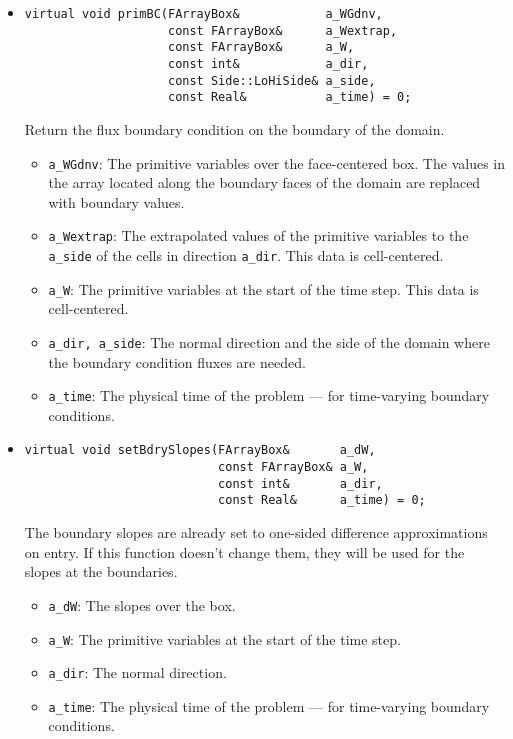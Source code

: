\begin{itemize}
\item \begin{small}\begin{verbatim}
virtual void primBC(FArrayBox&            a_WGdnv,
                    const FArrayBox&      a_Wextrap,
                    const FArrayBox&      a_W,
                    const int&            a_dir,
                    const Side::LoHiSide& a_side,
                    const Real&           a_time) = 0;
\end{verbatim}\end{small}
Return the flux boundary condition on the boundary of
the domain.
\begin{itemize}
\item \verb/a_WGdnv/:  The primitive variables over the face-centered
box. The values in the array located along the boundary faces of the
domain are replaced with boundary values.
\vspace{-0.07in}
\item \verb/a_Wextrap/:  The extrapolated values of the primitive variables
to the \verb/a_side/ of the cells in direction \verb/a_dir/.
This data is cell-centered.
\vspace{-0.07in}
\item \verb/a_W/:  The primitive variables at the start of the time step.
This data is cell-centered.
\vspace{-0.07in}
\item \verb/a_dir, a_side/:  The normal direction and the side of the
domain where the boundary condition fluxes are needed. 
\vspace{-0.07in}
\item \verb/a_time/:  The physical time of the problem --- for time-varying
boundary conditions.
\end{itemize}

\item \begin{small}\begin{verbatim}
virtual void setBdrySlopes(FArrayBox&       a_dW,
                           const FArrayBox& a_W,
                           const int&       a_dir,
                           const Real&      a_time) = 0;
\end{verbatim}\end{small}
The boundary slopes are already set to one-sided difference approximations on
entry.  If this function doesn't change them, they will be used for the slopes
at the boundaries.
\begin{itemize}
\item \verb/a_dW/:  The slopes over the box.
\vspace{-0.07in}
\item \verb/a_W/:  The primitive variables at the start of the time step.
\vspace{-0.07in}
\item \verb/a_dir/:  The normal direction.
\vspace{-0.07in}
\item \verb/a_time/:  The physical time of the problem --- for time-varying
boundary conditions.
\end{itemize}


\end{itemize}
